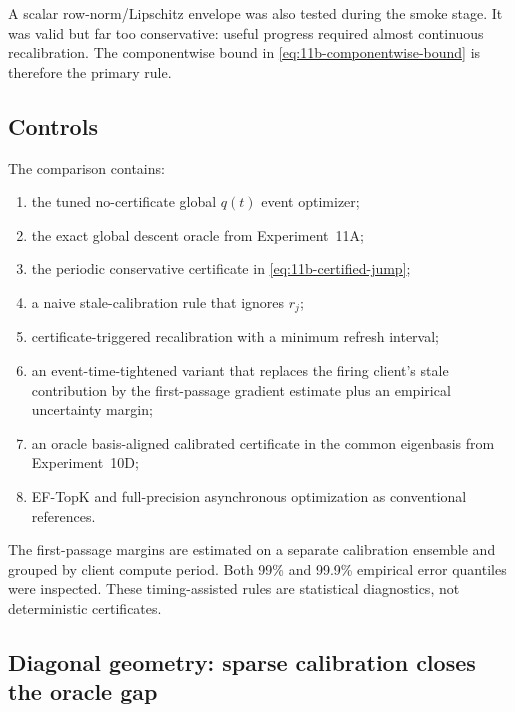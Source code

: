 A scalar row-norm/Lipschitz envelope was also tested during the smoke stage. It was valid but far too conservative: useful progress required almost continuous recalibration. The componentwise bound in \cref{eq:11b-componentwise-bound} is therefore the primary rule.

\subsection{Controls}

The comparison contains:
\begin{enumerate}
  \item the tuned no-certificate global $q(t)$ event optimizer;
  \item the exact global descent oracle from Experiment~11A;
  \item the periodic conservative certificate in \cref{eq:11b-certified-jump};
  \item a naive stale-calibration rule that ignores $r_j$;
  \item certificate-triggered recalibration with a minimum refresh interval;
  \item an event-time-tightened variant that replaces the firing client's stale contribution by the first-passage gradient estimate plus an empirical uncertainty margin;
  \item an oracle basis-aligned calibrated certificate in the common eigenbasis from Experiment~10D;
  \item EF-TopK and full-precision asynchronous optimization as conventional references.
\end{enumerate}
The first-passage margins are estimated on a separate calibration ensemble and grouped by client compute period. Both 99\% and 99.9\% empirical error quantiles were inspected. These timing-assisted rules are statistical diagnostics, not deterministic certificates.

\subsection{Diagonal geometry: sparse calibration closes the oracle gap}

